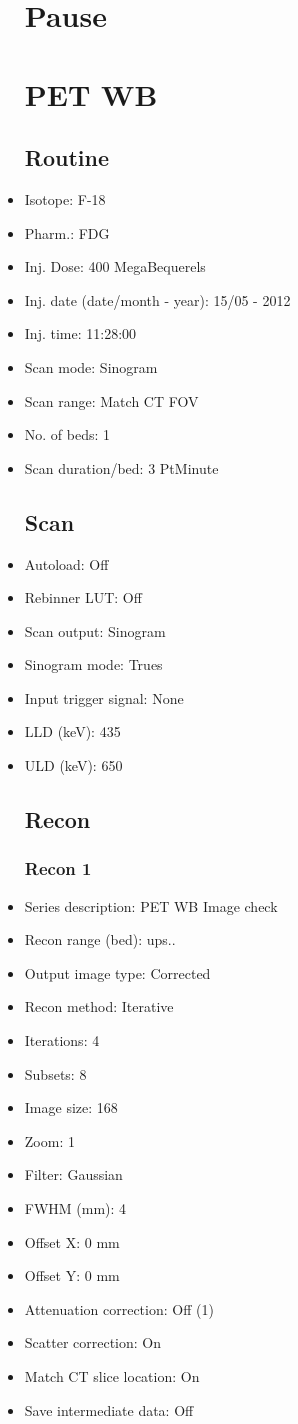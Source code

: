 \documentclass[12pt]{article}
\begin{document}
\begin{itemize}
\section{Pause}

\section{PET WB}
\subsection{Routine}
\item Isotope: F-18
\item Pharm.: FDG
\item Inj. Dose: 400 MegaBequerels
\item Inj. date (date/month - year): 15/05 - 2012
\item Inj. time: 11:28:00
\item Scan mode: Sinogram
\item Scan range: Match CT FOV
\item No. of beds: 1
\item Scan duration/bed: 3 PtMinute
\subsection{Scan}
\item Autoload: Off
\item Rebinner LUT: Off
\item Scan output: Sinogram
\item Sinogram mode: Trues
\item Input trigger signal: None
\item LLD (keV): 435
\item ULD (keV): 650
\subsection{Recon}

\subsubsection{Recon 1}
\item Series description: PET WB Image check
\item Recon range (bed): ups..
\item Output image type: Corrected
\item Recon method: Iterative
\item Iterations: 4
\item Subsets: 8
\item Image size: 168
\item Zoom: 1
\item Filter: Gaussian
\item FWHM (mm): 4
\item Offset X: 0 mm
\item Offset Y: 0 mm
\item Attenuation correction: Off (1)
\item Scatter correction: On
\item Match CT slice location: On
\item Save intermediate data: Off

\end{itemize}
\end{document}
